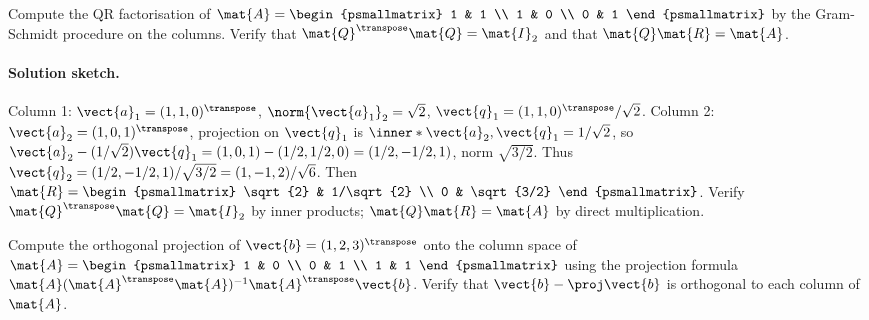 \begin{exercise}
Compute the QR factorisation of $\mat{A} = \begin{psmallmatrix} 1
& 1 \\ 1 & 0 \\ 0 & 1 \end{psmallmatrix}$ by the Gram-Schmidt
procedure on the columns. Verify that $\mat{Q}^{\transpose}\mat{Q}
= \mat{I}_{2}$ and that $\mat{Q}\mat{R} = \mat{A}$.
\end{exercise}

\paragraph{Solution sketch.}
Column 1: $\vect{a}_{1} = (1, 1, 0)^{\transpose}$, $\norm{\vect{a}_{1}}_{2}
= \sqrt{2}$, $\vect{q}_{1} = (1, 1, 0)^{\transpose}/\sqrt{2}$.
Column 2: $\vect{a}_{2} = (1, 0, 1)^{\transpose}$, projection on
$\vect{q}_{1}$ is $\inner*{\vect{a}_{2}, \vect{q}_{1}} = 1/\sqrt{2}$,
so $\vect{a}_{2} - (1/\sqrt{2})\vect{q}_{1} = (1, 0, 1) - (1/2,
1/2, 0) = (1/2, -1/2, 1)$, norm $\sqrt{3/2}$. Thus $\vect{q}_{2} =
(1/2, -1/2, 1)/\sqrt{3/2} = (1, -1, 2)/\sqrt{6}$. Then
$\mat{R} = \begin{psmallmatrix} \sqrt{2} & 1/\sqrt{2} \\ 0 &
\sqrt{3/2} \end{psmallmatrix}$. Verify $\mat{Q}^{\transpose}\mat{Q}
= \mat{I}_{2}$ by inner products; $\mat{Q}\mat{R} = \mat{A}$ by
direct multiplication.

\begin{exercise}
Compute the orthogonal projection of $\vect{b} = (1, 2, 3)^{\transpose}$
onto the column space of $\mat{A} = \begin{psmallmatrix} 1 & 0 \\
0 & 1 \\ 1 & 1 \end{psmallmatrix}$ using the projection formula
$\mat{A}(\mat{A}^{\transpose}\mat{A})^{-1}\mat{A}^{\transpose}
\vect{b}$. Verify that $\vect{b} - \proj\vect{b}$ is orthogonal
to each column of $\mat{A}$.
\end{exercise}

